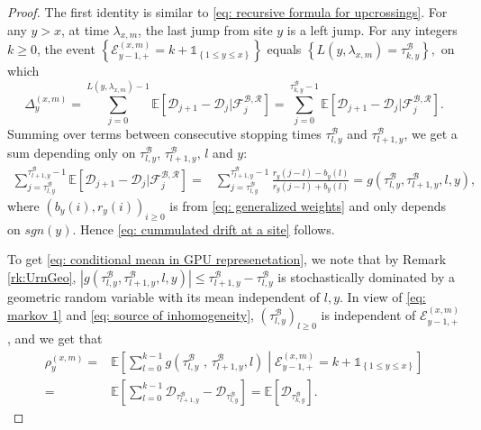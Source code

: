 \documentclass[EJP]{ejpecp} %
\newcommand{\abs}[1]{\left\vert #1 \right\vert}
\begin{document}
\begin{proof} 
	The first identity is similar to \eqref{eq: recursive formula for upcrossings}.
	For any $y>x $, at time $\lambda_{x,m}$, the last jump from site $y$ is a left jump. For any integers $k\geq 0$, the event 
	$\left\{ \mathcal{E}^{(x,m)}_{y-1,+} =k +  \mathbb{1}_{\left\{1\leq y\leq x\right\}}\right\}$ equals $\left\{  L(y,\lambda_{x,m}) = \tau_{k,y}^{\mathscr{B}} \right\}, $ on which
	\[
	\Delta_{y}^{(x,m)} =\sum_{j=0}^{ L(y,\lambda_{x,m})-1} \mathbb{E}\left[ \mathscr{D}_{j+1} -\mathscr{D}_{j}  \vert \mathcal{F}^{\mathscr{B},\mathscr{R}}_{j} \right] = \sum_{j=0}^{\tau^\mathscr{B}_{k,y}-1} \mathbb{E}\left[ \mathscr{D}_{j+1} -\mathscr{D}_{j}  \vert \mathcal{F}^{\mathscr{B},\mathscr{R}}_{j} \right].  
	\] 
	Summing over terms between consecutive stopping times $\tau^{{\mathscr{B}}}_{l,y} $ and $\tau^{\mathscr{B}}_{l+1,y} $,  we get a sum depending only on $\tau^{\mathscr{B}}_{l,y} $, $\tau^{\mathscr{B}}_{l+1,y} $, $l$ and $y$:
	\begin{align} \label{eq: conditional increment}
		\sum_{j=\tau^{\mathscr{B}}_{l,y}}^{\tau^{\mathscr{B}}_{l+1,y}-1} \mathbb{E}\left[ \mathscr{D}_{j+1} - \mathscr{D}_{j}  \vert \mathcal{F}^{\mathscr{B},\mathscr{R}}_{j} \right] =&
		\sum_{j=\tau^{\mathscr{B}}_{l,y}}^{\tau^{\mathscr{B}}_{l+1,y}-1} \frac{ r_y( j-l) - b_y(l)  }{ r_y( j-l) + b_y(l)  } 
		=  g\left(\tau^{\mathscr{B}}_{l,y},\tau^{\mathscr{B}}_{l+1,y},l,y\right),
	\end{align}   
	where $(b_y(i),r_y(i))_{i\geq 0}$ is from \eqref{eq: generalized weights} and only depends on $sgn(y)$. Hence \eqref{eq: cummulated drift at a site} follows.
	
	To get \eqref{eq: conditional mean in GPU represenetation}, we note that by Remark \ref{rk:UrnGeo}, $\abs{  g\left(\tau^{\mathscr{B}}_{l,y},\tau^{\mathscr{B}}_{l+1,y},l,y\right)} \leq  \tau^{\mathscr{B}}_{l+1,y}-\tau^{\mathscr{B}}_{l,y}$ is stochastically dominated by a geometric random variable with its mean independent of $l, y$. In view of \eqref{eq: markov 1} and \eqref{eq: source of inhomogeneity}, $\left(\tau^{\mathscr{B}}_{l,y}\right)_{l \geq 0} $ is independent of $ \mathcal{E}^{(x,m)}_{y-1,+}$, and we get that 
	\begin{align*} 
		\rho_{y}^{(x,m)} 
		=& \mathbb{E}\left[ \sum_{l=0 }^{ k -1  }  g\left(\tau^{\mathscr{B}}_{l,y}\,\,,\,\tau^{\mathscr{B}}_{l+1,y} , l \right) \middle| \mathcal{E}^{(x,m)}_{y-1,+} = k + \mathbb{1}_{\left\{1\leq y\leq x\right\}} \right]	
		\\
		=&
		 \mathbb{E}\left[ \sum_{l=0}^{k-1}  \mathscr{D}_{\tau^{\mathscr{B}}_{l+1,y}} -\mathscr{D}_{\tau^{\mathscr{B}}_{l,y}} \right]  
		= \mathbb{E}\left[  \mathscr{D}_{\tau^{\mathscr{B}}_{k,y}} \right]
		.
	\end{align*}
\end{proof}
\end{document}

